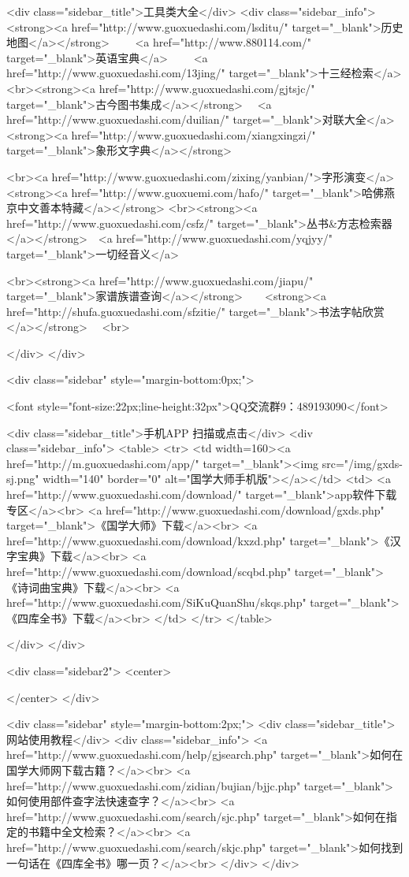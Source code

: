  
<div class="sidebar_title">工具类大全</div>
<div class="sidebar_info">
<strong><a href="http://www.guoxuedashi.com/lsditu/" target="_blank">历史地图</a></strong>　　
<a href="http://www.880114.com/" target="_blank">英语宝典</a>　　
<a href="http://www.guoxuedashi.com/13jing/" target="_blank">十三经检索</a>　
<br><strong><a href="http://www.guoxuedashi.com/gjtsjc/" target="_blank">古今图书集成</a></strong>　
<a href="http://www.guoxuedashi.com/duilian/" target="_blank">对联大全</a>　<strong><a href="http://www.guoxuedashi.com/xiangxingzi/" target="_blank">象形文字典</a></strong>　

<br><a href="http://www.guoxuedashi.com/zixing/yanbian/">字形演变</a>　　<strong><a href="http://www.guoxuemi.com/hafo/" target="_blank">哈佛燕京中文善本特藏</a></strong>
<br><strong><a href="http://www.guoxuedashi.com/csfz/" target="_blank">丛书&方志检索器</a></strong>　<a href="http://www.guoxuedashi.com/yqjyy/" target="_blank">一切经音义</a>　　

<br><strong><a href="http://www.guoxuedashi.com/jiapu/" target="_blank">家谱族谱查询</a></strong>　　<strong><a href="http://shufa.guoxuedashi.com/sfzitie/" target="_blank">书法字帖欣赏</a></strong>　
<br>

</div>
</div>


<div class="sidebar" style="margin-bottom:0px;">

<font style="font-size:22px;line-height:32px">QQ交流群9：489193090</font>


<div class="sidebar_title">手机APP 扫描或点击</div>
<div class="sidebar_info">
<table>
<tr>
	<td width=160><a href="http://m.guoxuedashi.com/app/" target="_blank"><img src="/img/gxds-sj.png" width="140"  border="0" alt="国学大师手机版"></a></td>
	<td>
<a href="http://www.guoxuedashi.com/download/" target="_blank">app软件下载专区</a><br>
<a href="http://www.guoxuedashi.com/download/gxds.php" target="_blank">《国学大师》下载</a><br>
<a href="http://www.guoxuedashi.com/download/kxzd.php" target="_blank">《汉字宝典》下载</a><br>
<a href="http://www.guoxuedashi.com/download/scqbd.php" target="_blank">《诗词曲宝典》下载</a><br>
<a href="http://www.guoxuedashi.com/SiKuQuanShu/skqs.php" target="_blank">《四库全书》下载</a><br>
</td>
</tr>
</table>

</div>
</div>


<div class="sidebar2">
<center>


</center>
</div>

<div class="sidebar"  style="margin-bottom:2px;">
<div class="sidebar_title">网站使用教程</div>
<div class="sidebar_info">
<a href="http://www.guoxuedashi.com/help/gjsearch.php" target="_blank">如何在国学大师网下载古籍？</a><br>
<a href="http://www.guoxuedashi.com/zidian/bujian/bjjc.php" target="_blank">如何使用部件查字法快速查字？</a><br>
<a href="http://www.guoxuedashi.com/search/sjc.php" target="_blank">如何在指定的书籍中全文检索？</a><br>
<a href="http://www.guoxuedashi.com/search/skjc.php" target="_blank">如何找到一句话在《四库全书》哪一页？</a><br>
</div>
</div>


